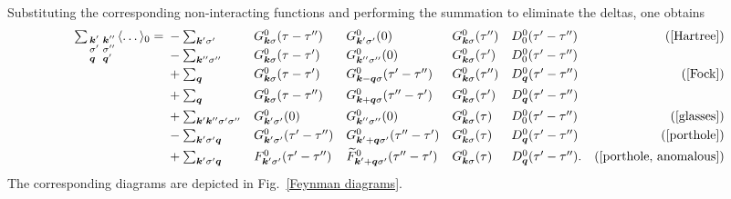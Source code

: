 Substituting the corresponding non-interacting  functions
and performing the summation to eliminate the  deltas, one
obtains
%
\begin{align*}
    \sum_{\smash[b]{\begin{smallmatrix*}[l]
        \vec k' & \vec k'' \\
        \sigma' & \sigma'' \\
        \vec q & \vec q'
    \end{smallmatrix*}}}
    \av \dots_0 =
    \let\displaystyle\textstyle
    \begin{aligned}[t]
        &- \sum_{\vec k' \sigma'}
        && G^0_{\vec k \sigma}(\tau - \tau'')
        && G^0_{\vec k' \sigma'}(0)
        && G^0_{\vec k \sigma}(\tau'')
        && D^0_0(\tau' - \tau'')
        &  \text{(\ref{Hartree})} \\
        &- \sum_{\vec k'' \sigma''}
        && G^0_{\vec k \sigma}(\tau - \tau')
        && G^0_{\vec k'' \sigma''}(0)
        && G^0_{\vec k \sigma}(\tau')
        && D^0_0(\tau' - \tau'')
        &  \\
        &+ \sum_{\vec q}
        && G^0_{\vec k \sigma}(\tau - \tau')
        && G^0_{\vec k - \vec q \sigma}(\tau' - \tau'')
        && G^0_{\vec k \sigma}(\tau'')
        && D^0_{\vec q}(\tau' - \tau'')
        &  \text{(\ref{Fock})} \\
        &+ \sum_{\vec q}
        && G^0_{\vec k \sigma}(\tau - \tau'')
        && G^0_{\vec k + \vec q \sigma}(\tau'' - \tau')
        && G^0_{\vec k \sigma}(\tau')
        && D^0_{\vec q}(\tau' - \tau'')
        &  \\
        &+ \textstyle \sum_{\vec k' \vec k'' \sigma' \sigma''}
        && G^0_{\vec k' \sigma'}(0)
        && G^0_{\vec k'' \sigma''}(0)
        && G^0_{\vec k \sigma}(\tau)
        && D^0_0(\tau' - \tau'')
        &  \text{(\ref{glasses})} \\
        &- \sum_{\vec k' \sigma' \vec q}
        && G^0_{\vec k' \sigma'}(\tau' - \tau'')
        && G^0_{\vec k' + \vec q \sigma'}(\tau'' - \tau')
        && G^0_{\vec k \sigma}(\tau)
        && D^0_{\vec q}(\tau' - \tau'')
        &  \text{(\ref{porthole})} \\
        &+ \sum_{\vec k' \sigma' \vec q}
        && F^0_{\vec k' \sigma'}(\tau' - \tau'')
        && \smash{\widetilde F^0_{\vec k' + \vec q \sigma'}}(\tau'' - \tau')
        && G^0_{\vec k \sigma}(\tau)
        && D^0_{\vec q}(\tau' - \tau'').
        &  \text{(\ref{porthole, anomalous})}
    \end{aligned}
\end{align*}
%
The corresponding  diagrams are depicted in Fig.~\ref{Feynman
diagrams}.

